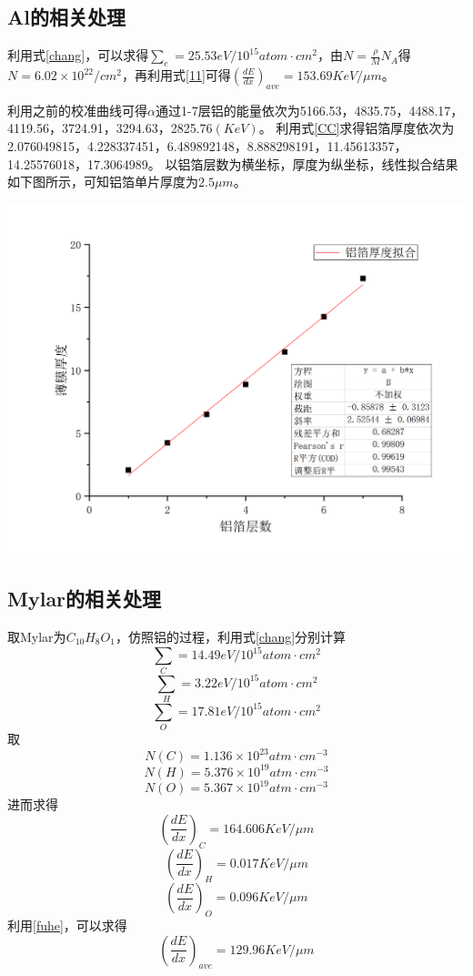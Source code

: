\documentclass[hyperref]{ctexart}
\begin{document}
\begin{multicols}{2}
	\subsection{Al的相关处理}
	利用式\eqref{chang}，可以求得${\sum}_e=25.53 eV/10^{15} atom\cdot{cm}^2$，由$N=\frac{\rho}{M}N_A$得$N=6.02\times 10^{22}/cm^2$，再利用式\eqref{11}可得$(\frac{dE}{dx})_{ave}=153.69KeV/\mu m$。

	利用之前的校准曲线可得$\alpha$通过1-7层铝的能量依次为5166.53，4835.75，4488.17，4119.56，3724.91，3294.63，2825.76$(KeV)$。
利用式\eqref{CC}求得铝箔厚度依次为2.076049815，4.228337451，6.489892148，8.888298191，11.45613357，14.25576018，17.3064989。
以铝箔层数为横坐标，厚度为纵坐标，线性拟合结果如下图所示，可知铝箔单片厚度为$2.5\mu m$。
	\begin{center}\includegraphics[scale=0.3]{T3.png}\end{center}

	\subsection{Mylar的相关处理}
	取Mylar为$C_{10}H_8 O_1$，仿照铝的过程，利用式\eqref{chang}分别计算$${\sum}_C=14.49 eV/10^{15} atom\cdot{cm}^2$$ 
$${\sum}_H=3.22 eV/10^{15} atom\cdot{cm}^2$$ $${\sum}_O=17.81 eV/10^{15} atom\cdot{cm}^2$$
取$$N(C)=1.136\times10^{23}atm\cdot cm^{-3}$$ $$N(H)=5.376\times10^{19}atm\cdot cm^{-3}$$ $$N(O)=5.367\times10^{19}atm\cdot cm^{-3}$$ 
进而求得$$(\frac{dE}{dx})_{C}=164.606KeV/\mu m$$ $$(\frac{dE}{dx})_{H}=0.017KeV/\mu m$$ $$(\frac{dE}{dx})_{O}=0.096KeV/\mu m$$
利用\eqref{fuhe}，可以求得$$(\frac{dE}{dx})_{ave}=129.96KeV/\mu m$$


\end{multicols}
\end{document}
